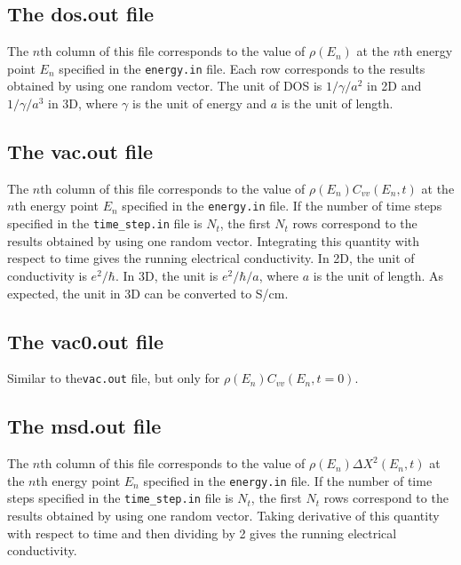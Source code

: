 \documentclass[12pt,a4paper]{report}
\begin{document}
\subsection{The dos.out file}

The $n$th column of this file corresponds to the value of $\rho(E_n)$ at the $n$th energy point $E_n$ specified in the \verb"energy.in" file. Each row corresponds to the results obtained by using one random vector. The unit of DOS is $1/\gamma/a^2$ in 2D and $1/\gamma/a^3$ in 3D, where $\gamma$ is the unit of energy and $a$ is the unit of length.


\subsection{The vac.out file}

The $n$th column of this file corresponds to the value of $\rho(E_n)C_{vv}(E_n,t)$ at the $n$th energy point $E_n$ specified in the \verb"energy.in" file. If the number of time steps specified in the \verb"time_step.in" file is $N_t$, the first $N_t$ rows correspond to the results obtained by using one random vector. Integrating this quantity with respect to time gives the running electrical conductivity. In 2D, the unit of conductivity is $e^2/\hbar$. In 3D, the unit is $e^2/\hbar/a$, where $a$ is the unit of length. As expected, the unit in 3D can be converted to S/cm.

\subsection{The vac0.out file}
Similar to the\verb"vac.out"  file, but only for $\rho(E_n)C_{vv}(E_n,t=0)$.

\subsection{The msd.out file}

The $n$th column of this file corresponds to the value of $\rho(E_n) \Delta X^2(E_n,t)$ at the $n$th energy point $E_n$ specified in the \verb"energy.in" file. If the number of time steps specified in the \verb"time_step.in" file is $N_t$, the first $N_t$ rows correspond to the results obtained by using one random vector. Taking derivative of this quantity with respect to time and then dividing by 2 gives the running electrical conductivity. 









\end{document}
